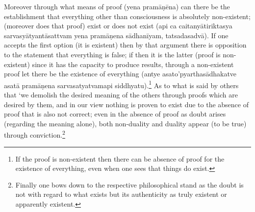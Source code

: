 Moreover through what means of proof (yena pramāṇēna) can there be the establishment that everything other than consciousness is absolutely non-existent; (moreover does that proof) exist or does not exist (api ca caitanyātiriktasya sarvasyātyantāsattvam yena pramāṇena sādhanīyam, tatsadasadvā). If one accepts the first option (it is existent) then by that argument there is opposition to the statement that everything is false; if then it is the latter (proof is non-existent) since it has the capacity to produce results, through a non-existent proof let there be the existence of everything (antye asato’pyarthasādhakatve asatā pramāṇena sarvasatyatvamapi siddhyatu).\footnote{If the proof is non-existent then there can be absence of proof for the existence of everything, even when one sees that things do exist.} As to what is said by others that ‘we demolish the desired meaning of the others through proofs which are desired by them, and in our view nothing is proven to exist due to the absence of proof that is also not correct; even in the absence of proof as doubt arises (regarding the meaning alone), both non-duality and duality appear (to be true) through conviction.\footnote{Finally one bows down to the respective philosophical stand as the doubt is not with regard to what exists but its authenticity as truly existent or apparently existent.} 

\vskip 2pt

